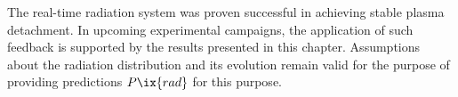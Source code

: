         The real-time radiation system was proven successful in achieving stable plasma detachment. In upcoming experimental campaigns, the application of such feedback is supported by the results presented in this chapter. Assumptions about the radiation distribution and its evolution remain valid for the purpose of providing predictions $P\ix{rad}$ for this purpose.%
%
